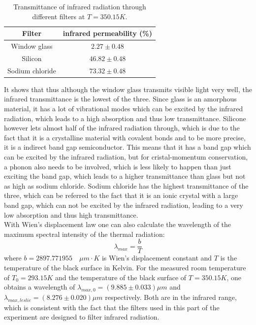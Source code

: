         \begin{table}
            \centering
            \begin{tabular}{c|c}
                Filter & infrared permeability (\%)\\
                \hline
                Window glass & $2.27 \pm 0.48$ \\
                Silicon & $46.82 \pm 0.48$ \\
                Sodium chloride & $73.32 \pm 0.48$ \\
            \end{tabular}
            \caption{Transmittance of infrared radiation through different filters at $T = 350.15 K$.}
            \label{tab:filters}
        \end{table}
        \noindent
        It shows that thus although the window glass transmits visible light very well, the infrared transmittance is the lowest of the three. 
        Since glass is an amorphous material, it has a lot of vibrational modes which can be excited by the infrared radiation, which leads 
        to a high absorption and thus low transmittance. Silicone however lets almost half of the infrared radiation through, 
        which is due to the fact that it is a crystalline material with covalent bonds and to be more precise, it is a indirect band gap semiconductor.
        This means that it has a band gap which can be excited by the infrared radiation, but for cristal-momentum conservation, a phonon also needs 
        to be involved, which is less likely to happen than just exciting the band gap, which leads to a higher transmittance than glass but not as high as 
        sodium chloride. Sodium chloride has the highest transmittance of the three, which can be referred to the fact that it is an ionic crystal with a 
        large band gap, which can not be excited by the infrared radiation, leading to a very low absorption and thus high transmittance. \\
        \noindent
        With Wien's displacement law one can also calculate the wavelength of the maximum spectral intensity of the thermal radiation:
        \begin{equation}
            \lambda_{max} = \frac{b}{T}
        \end{equation}
        where $b = 2897.771955 \quad \mu m \cdot K$ is Wien's displacement constant and $T$ is the temperature of the black surface in Kelvin. 
        For the measured room temperature of $T_0 = 293.15 K$ and the temperature of the black surface of $T = 350.15 K$, 
        one obtains a wavelength of $\lambda_{max,0} = (9.885 \pm 0.033 )\mu m$ and $\lambda_{max,leslie} = (8.276 \pm 0.020)\mu m$ respectively.
        Both are in the infrared range, which is consistent with the fact that the filters used in this part of the experiment are designed to 
        filter infrared radiation.


